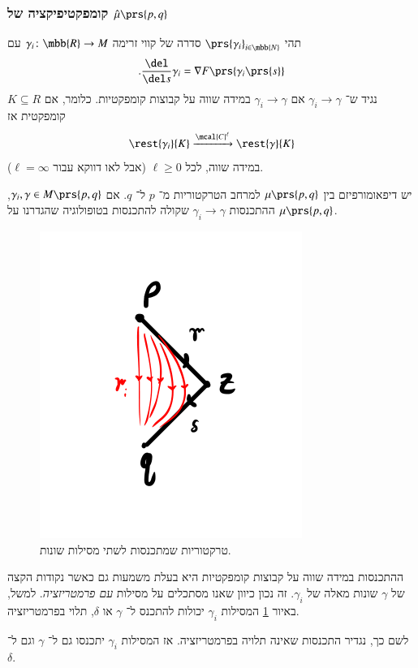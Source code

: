 \documentclass[a4paper,10pt,twoside,openany]{book}
\begin{document}
\subsubsection{קומפקטיפיקציה של
$\hat{\mu}\prs{p,q}$}

\begin{definition}
תהי
$\prs{\gamma_i}_{i \in \mbb{N}}$
סדרה של קווי זרימה
$\gamma_i \colon \mbb{R} \to M$
עם
\[\text{.} \frac{\del}{\del s} \gamma_i = \nabla F \prs{\gamma_i\prs{s}}\]
נגיד ש־%
$\gamma_i \to \gamma$
אם
$\gamma_i \to \gamma$
במידה שווה על קבוצות קומפקטיות.
כלומר, אם
$K \subseteq R$
קומפקטית אז
\[\rest{\gamma_i}{K} \xrightarrow{\mcal{C}^\ell} \rest{\gamma}{K}\]
במידה שווה, לכל
$\ell \geq 0$
(אבל לאו דווקא עבור
$\ell = \infty$).
\end{definition}

\begin{exercise}
יש דיפאומורפיזם בין
$\mu\prs{p,q}$
למרחב הטרקטוריות מ־%
$p$
ל־%
$q$.
אם
$\gamma_i, \gamma \in M\prs{p,q}$,
ההתכנסות
$\gamma_i \to \gamma$
שקולה להתכנסות בטופולוגיה שהגדרנו על
$\mu\prs{p,q}$.
\end{exercise}

\begin{figure}
\centering
\includegraphics[scale=0.5]{sources/6.3}
\caption{טרקטוריות שמתכנסות לשתי מסילות שונות.}
\label{6.3}
\end{figure}

\begin{remark}
ההתכנסות במידה שווה על קבוצות קומפקטיות היא בעלת משמעות גם כאשר נקודות הקצה של
$\gamma$
שונות מאלה של
$\gamma_i$.
זה נכון כיוון שאנו מסתכלים על מסילות
\emph{עם פרמטריזציה}.
למשל, באיור
\ref{6.3}
המסילות
$\gamma_i$
יכולות להתכנס ל־%
$\gamma$
או
$\delta$,
תלוי בפרמטריזציה.

לשם כך, נגדיר התכנסות שאינה תלויה בפרמטריזציה. אז המסילות
$\gamma_i$
יתכנסו גם ל־%
$\gamma$
וגם ל־%
$\delta$.
\end{remark}
\end{document}
